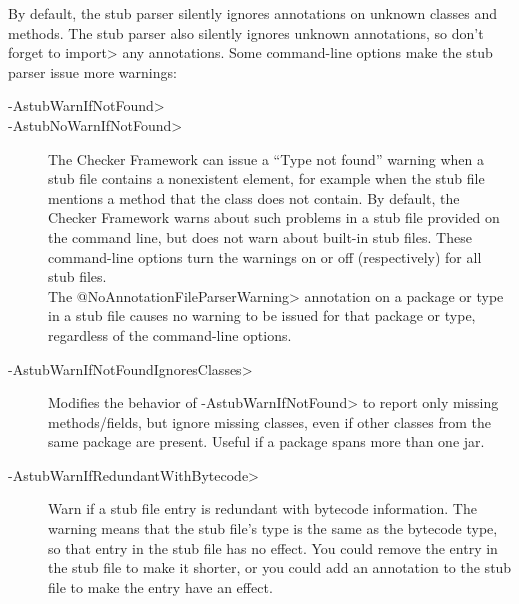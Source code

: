 By default, the stub parser silently ignores
annotations on unknown classes and methods.
The stub parser also silently ignores unknown annotations, so don't forget to
\<import> any annotations.
Some command-line options make the stub parser issue more warnings:

\begin{description}
\item[\<-AstubWarnIfNotFound>]
\item[\<-AstubNoWarnIfNotFound>]
  The Checker Framework can issue a ``Type not found'' warning
  when a stub file contains a nonexistent
  element, for example when the stub file mentions a method that the class
  does not contain.
  By default, the Checker Framework warns about such problems in a stub
  file provided on the command line, but does not warn about built-in stub files.
  These command-line options turn the warnings on or off (respectively) for
  all stub files. \\
  The \<@NoAnnotationFileParserWarning> annotation on a package or type in a stub file
  causes no warning to be issued for that package or type, regardless of
  the command-line options.


\item[\<-AstubWarnIfNotFoundIgnoresClasses>]
  Modifies the behavior of \<-AstubWarnIfNotFound>
  to report only missing methods/fields, but ignore missing classes, even if
  other classes from the same package are present.
  Useful if a package spans more than one jar.

\item[\<-AstubWarnIfRedundantWithBytecode>]
  Warn if a stub file entry is redundant with bytecode information.  The
  warning means that the stub file's type is the same as the bytecode type,
  so that entry in the stub file has no effect.  You could remove the
  entry in the stub file to make it shorter, or you could add an annotation
  to the stub file to make the entry have an effect.



\end{description}

